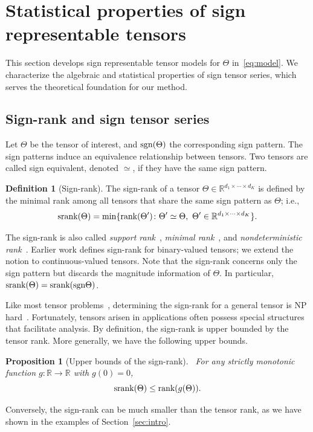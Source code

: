 \documentclass[11pt]{article}
\theoremstyle{plain}
\newtheorem{prop}{Proposition}
\theoremstyle{definition}
\newtheorem{defn}{Definition}
\def\sign{\textup{sgn}}
\def\srank{\textup{srank}}
\def\rank{\textup{rank}}
\begin{document}
\section{Statistical properties of sign representable tensors}\label{sec:representation}
This section develops sign representable tensor models for $\Theta$ in~\eqref{eq:model}. We characterize the algebraic and statistical properties of sign tensor series, which serves the theoretical foundation for our method. 


\subsection{Sign-rank and sign tensor series}\label{sec:sign-rank}
Let $\Theta$ be the tensor of interest, and $\sign (\Theta)$ the corresponding sign pattern. The sign patterns induce an equivalence relationship between tensors. Two tensors are called sign equivalent, denoted $\simeq$, if they have the same sign pattern.\\

\begin{defn}[Sign-rank]
The sign-rank of a tensor $\Theta\in\mathbb{R}^{d_1\times \cdots \times d_K}$ is defined by the minimal rank among all tensors that share the same sign pattern as $\Theta$; i.e.,
\[
\srank(\Theta) = \min \{\rank(\Theta')\colon  \Theta'\simeq \Theta,\ \Theta'\in\mathbb{R}^{d_1\times \cdots \times d_K}\}.
\]
\end{defn}
The sign-rank is also called \emph{support rank}~\citep{cohn2013fast}, \emph{minimal rank}~\citep{alon2016sign}, and \emph{nondeterministic rank}~\citep{de2003nondeterministic}. Earlier work defines sign-rank for binary-valued tensors; we extend the notion to continuous-valued tensors. Note that the sign-rank concerns only the sign pattern but discards the magnitude information of $\Theta$. In particular, $\srank(\Theta)=\srank(\sign \Theta)$. 

Like most tensor problems~\citep{hillar2013most}, determining the sign-rank for a general tensor is NP hard~\citep{alon2016sign}. Fortunately, tensors arisen in applications often possess special structures that facilitate analysis. By definition, the sign-rank is upper bounded by the tensor rank. More generally, we have the following upper bounds. \\

\begin{prop}[Upper bounds of the sign-rank]~\label{cor:monotonic} For any strictly monotonic function $g\colon \mathbb{R}\to \mathbb{R}$ with $g(0)=0$,
\[
\textup{srank}(\Theta)\leq\rank(g(\Theta)).
\]
\end{prop}
Conversely, the sign-rank can be much smaller than the tensor rank, as we have shown in the examples of Section~\ref{sec:intro}.\\
\end{document}
